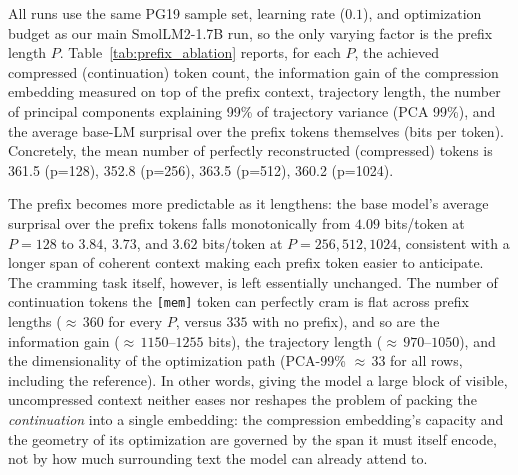 All runs use the same PG19 sample set, learning rate ($0.1$), and optimization budget as our main SmolLM2-1.7B run, so the only varying factor is the prefix length $P$. Table~\ref{tab:prefix_ablation} reports, for each $P$, the achieved compressed (continuation) token count, the information gain of the compression embedding measured on top of the prefix context, trajectory length, the number of principal components explaining 99\% of trajectory variance (PCA 99\%), and the average base-LM surprisal over the prefix tokens themselves (bits per token).
Concretely, the mean number of perfectly reconstructed (compressed) tokens is 361.5 (p=128), 352.8 (p=256), 363.5 (p=512), 360.2 (p=1024).

The prefix becomes more predictable as it lengthens: the base model's average surprisal over the prefix tokens falls monotonically from $4.09$ bits/token at $P{=}128$ to $3.84$, $3.73$, and $3.62$ bits/token at $P{=}256, 512, 1024$, consistent with a longer span of coherent context making each prefix token easier to anticipate. The cramming task itself, however, is left essentially unchanged. The number of continuation tokens the \texttt{[mem]} token can perfectly cram is flat across prefix lengths (${\approx}\,360$ for every $P$, versus $335$ with no prefix), and so are the information gain (${\approx}\,1150$--$1255$ bits), the trajectory length (${\approx}\,970$--$1050$), and the dimensionality of the optimization path (PCA-99\% ${\approx}\,33$ for all rows, including the reference). In other words, giving the model a large block of visible, uncompressed context neither eases nor reshapes the problem of packing the \emph{continuation} into a single embedding: the compression embedding's capacity and the geometry of its optimization are governed by the span it must itself encode, not by how much surrounding text the model can already attend to.

\begin{table}[t]
    \centering
    \caption{Fixed-prefix progressive cramming ablation on SmolLM2-1.7B. The model attends to a fixed, uncompressed prefix of $P$ real tokens and crams only the continuation that follows; the $P=0$ row is the no-prefix reference. All rows use the identical progressive-cramming eval (PG19, $\mathrm{lr}=0.1$). ``Compressed Tokens'' is the achieved continuation length $n$ (excluding the prefix), ``Trajectory Length'' is $L_{\text{traj}}$, ``PCA 99\%'' is the number of principal components explaining 99\% of trajectory variance, and ``Avg Prefix Surprisal'' is the base-LM next-token cross-entropy over the prefix tokens, in bits per token.}
    \label{tab:prefix_ablation}
    \begin{small}
    
    \end{small}
\vskip -0.1in
\end{table}

